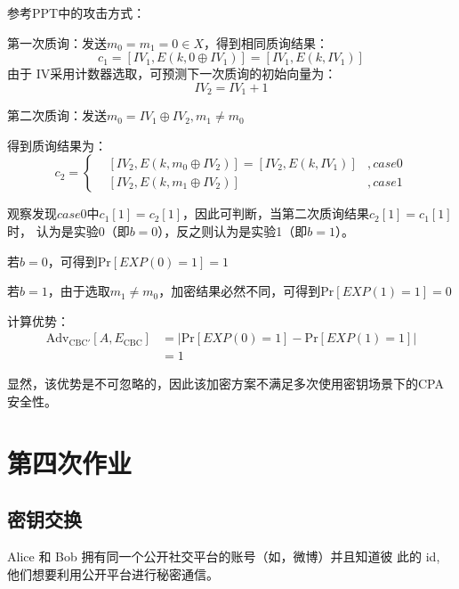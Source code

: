 \begin{Solution}
    参考PPT中的攻击方式：

    第一次质询：发送$m_0=m_1=0\in X$，得到相同质询结果：
    \begin{equation}
        c_1 = [IV_1, E(k, 0\oplus IV_1)] = [IV_1, E(k, IV_1)]
    \end{equation}
    由于 IV采用计数器选取，可预测下一次质询的初始向量为：
    \begin{equation}
        IV_2 = IV_1 + 1
    \end{equation}

    第二次质询：发送$m_0 = IV_1 \oplus IV_2, m_1 \neq m_0$

    得到质询结果为：
    \begin{equation}
        c_2 = \left\{
        \begin{aligned}
            &[IV_2, E(k,m_0 \oplus IV_2)] = [IV_2, E(k, IV_1)] &, case0\\
            &[IV_2, E(k,m_1\oplus IV_2)]    &,case1
        \end{aligned}
        \right.
    \end{equation}

    观察发现$case0$中$c_1[1] = c_2[1]$，因此可判断，当第二次质询结果$c_2[1]=c_1[1]$时，
    认为是实验0（即$b=0$），反之则认为是实验1（即$b=1$）。

    若$b=0$，可得到$\mathrm{Pr}[EXP(0)=1] = 1$

    若$b=1$，由于选取$m_1 \neq m_0$，加密结果必然不同，可得到$\mathrm{Pr}[EXP(1)=1] = 0$

    计算优势：
    \begin{equation}
        \begin{aligned}
            \mathrm{Adv_{CBC'}}[A, E_{\mathrm{CBC}}]    &= |\mathrm{Pr}[EXP(0)=1] - \mathrm{Pr}[EXP(1)=1]|\\
                                        &= 1
        \end{aligned}
    \end{equation}

    显然，该优势是不可忽略的，因此该加密方案不满足多次使用密钥场景下的CPA安全性。
    
\end{Solution}

\newpage
\chapter{第四次作业}

\section{密钥交换}
Alice 和 Bob 拥有同一个公开社交平台的账号（如，微博）并且知道彼
此的 id, 他们想要利用公开平台进行秘密通信。

